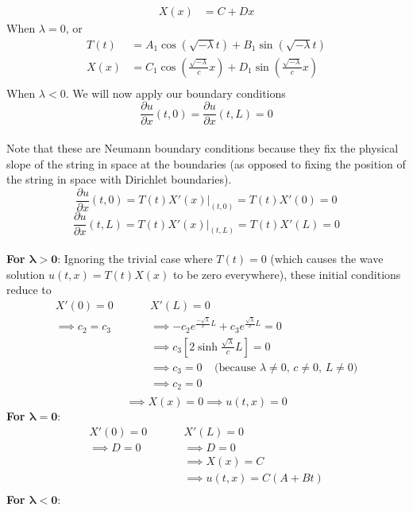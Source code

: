 \documentclass[12pt]{article}
\begin{document}
{\begin{align*}
X(x) &= C + Dx
\end{align*}
When $\lambda = 0$, or 
\begin{align*}
T(t) &= A_1 \cos(\sqrt{-\lambda} t) + B_1 \sin(\sqrt{-\lambda} t)\\
X(x) &= C_1 \cos\left( \frac{\sqrt{-\lambda}}{c} x \right) + D_1 \sin \left( \frac{\sqrt{-\lambda}}{c} x \right)\\
\end{align*}
When $\lambda < 0$.
We will now apply our boundary conditions \\ $$\frac{\partial u}{\partial x}(t,0) = \frac{\partial u}{\partial x}(t,L) = 0$$ \\ Note that these are Neumann boundary conditions because they fix the physical slope of the string in space at the boundaries (as opposed to fixing the position of the string in space with Dirichlet boundaries). \\
$$\frac{\partial u}{\partial x}(t,0) = T(t)X'(x) \left. \right|_{(t,0)} = T(t)X'(0) = 0$$
$$\frac{\partial u}{\partial x}(t,L) = T(t)X'(x) \left. \right|_{(t,L)} = T(t)X'(L) = 0$$ \\
\textbf{For $\mathbf{\lambda > 0}$}: Ignoring the trivial case where $T(t) = 0$ (which causes the wave solution $u(t,x) = T(t)X(x)$ to be zero everywhere), these initial conditions reduce to \\
\begin{align*}
X'(0) = 0 \;\;\;\;\;\;\;\;\;& X'(L) = 0 \\
\implies c_2 = c_3 \;\;\;\;\;\;\;\;\;& \implies -c_2 e^{\frac{-\sqrt{\lambda}}{c} L} + c_3 e^{\frac{\sqrt{\lambda}}{c} L} = 0 \\
& \implies c_3 \left[2 \sinh{\frac{\sqrt{\lambda}}{c}L}\right] = 0 \\
& \implies c_3 = 0 \;\;\;\; \text{(because $\lambda \neq 0$, $c \neq 0$, $L \neq 0$)}\\
& \implies c_2 = 0 \\
\end{align*}
$$\implies X(x) = 0 \implies u(t,x) = 0$$
\textbf{For $\mathbf{\lambda = 0}$}:
\begin{align*}
X'(0) = 0 \;\;\;\;\;\;\;\;\;& X'(L) = 0 \\
\implies D = 0 \;\;\;\;\;\;\;\;\;& \implies D = 0 \\
& \implies X(x) = C \\
& \implies u(t,x) = C(A + Bt) \\
\end{align*}
\textbf{For $\mathbf{\lambda < 0}$}:
\begin{align*}

\end{align*}}
\end{document}
